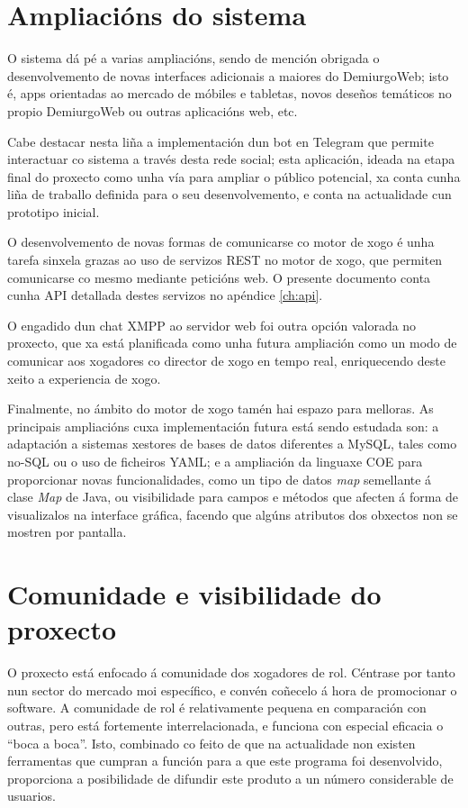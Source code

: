 \section{Ampliacións do sistema}
O sistema dá pé a varias ampliacións, sendo de mención obrigada o
desenvolvemento de novas interfaces adicionais a maiores do DemiurgoWeb; isto é,
apps orientadas ao mercado de móbiles e tabletas, novos deseños temáticos no
propio DemiurgoWeb ou outras aplicacións web, etc.

Cabe destacar nesta liña a implementación dun bot en Telegram que permite
interactuar co sistema a través desta rede social; esta aplicación, ideada na
etapa final do proxecto como unha vía para ampliar o público potencial, xa
conta cunha liña de traballo definida para o seu desenvolvemento, e conta na
actualidade cun prototipo inicial.

O desenvolvemento de novas formas de comunicarse co motor de xogo é unha tarefa
sinxela grazas ao uso de servizos REST no motor de xogo, que permiten
comunicarse co mesmo mediante peticións web. O presente documento conta cunha
API detallada destes servizos no apéndice \ref{ch:api}.

O engadido dun chat XMPP ao servidor web foi outra opción valorada no proxecto,
que xa está planificada como unha futura ampliación como un modo de comunicar
aos xogadores co director de xogo en tempo real, enriquecendo deste xeito a
experiencia de xogo.

Finalmente, no ámbito do motor de xogo tamén hai espazo para melloras. As
principais ampliacións cuxa implementación futura está sendo estudada son: a
adaptación a sistemas xestores de bases de datos diferentes a MySQL, tales como
no-SQL ou o uso de ficheiros YAML; e a ampliación da linguaxe COE para
proporcionar novas funcionalidades, como un tipo de datos \textit{map}
semellante á clase \textit{Map} de Java, ou visibilidade para campos e métodos
que afecten á forma de visualizalos na interface gráfica, facendo que algúns
atributos dos obxectos non se mostren por pantalla.

\section{Comunidade e visibilidade do proxecto}
O proxecto está enfocado á comunidade dos xogadores de rol. Céntrase por tanto
nun sector do mercado moi específico, e convén coñecelo á hora de promocionar
o software. A comunidade de rol é relativamente pequena en comparación con
outras, pero está fortemente interrelacionada, e funciona con especial eficacia
o ``boca a boca''. Isto, combinado co feito de que na actualidade non existen
ferramentas que cumpran a función para a que este programa foi desenvolvido,
proporciona a posibilidade de difundir este produto a un número considerable de
usuarios.

